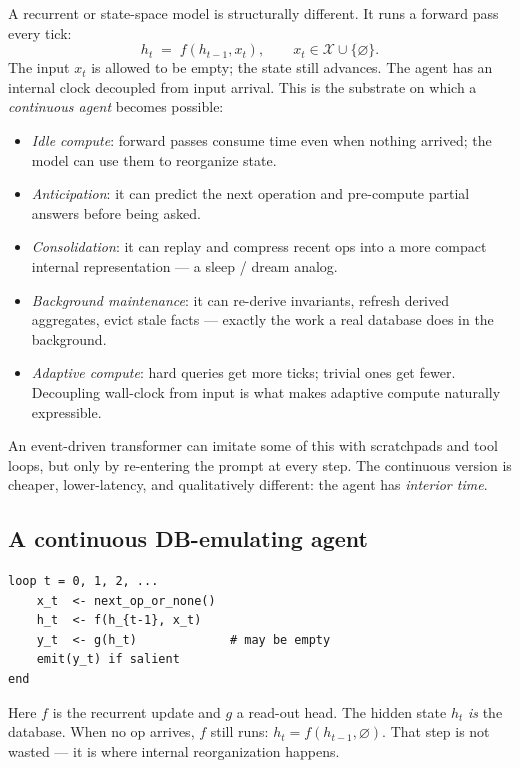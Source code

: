 \documentclass[11pt]{article}
\begin{document}
A recurrent or state-space model is structurally different. It runs a
forward pass every tick:
\[
  h_t \;=\; f(h_{t-1}, x_t), \qquad x_t \in \mathcal{X} \cup \{\varnothing\}.
\]
The input $x_t$ is allowed to be empty; the state still advances. The
agent has an internal clock decoupled from input arrival. This is the
substrate on which a \emph{continuous agent} becomes possible:

\begin{itemize}[leftmargin=*]
  \item \emph{Idle compute}: forward passes consume time even when
    nothing arrived; the model can use them to reorganize state.
  \item \emph{Anticipation}: it can predict the next operation and
    pre-compute partial answers before being asked.
  \item \emph{Consolidation}: it can replay and compress recent ops
    into a more compact internal representation --- a sleep / dream
    analog.
  \item \emph{Background maintenance}: it can re-derive invariants,
    refresh derived aggregates, evict stale facts --- exactly the work
    a real database does in the background.
  \item \emph{Adaptive compute}: hard queries get more ticks; trivial
    ones get fewer. Decoupling wall-clock from input is what makes
    adaptive compute naturally expressible.
\end{itemize}

An event-driven transformer can imitate some of this with scratchpads
and tool loops, but only by re-entering the prompt at every step. The
continuous version is cheaper, lower-latency, and qualitatively
different: the agent has \emph{interior time}.

\subsection{A continuous DB-emulating agent}

\begin{lstlisting}
loop t = 0, 1, 2, ...
    x_t  <- next_op_or_none()
    h_t  <- f(h_{t-1}, x_t)
    y_t  <- g(h_t)             # may be empty
    emit(y_t) if salient
end
\end{lstlisting}

Here $f$ is the recurrent update and $g$ a read-out head. The hidden
state $h_t$ \emph{is} the database. When no op arrives, $f$ still runs:
$h_t = f(h_{t-1}, \varnothing)$. That step is not wasted --- it is
where internal reorganization happens.
\end{document}
